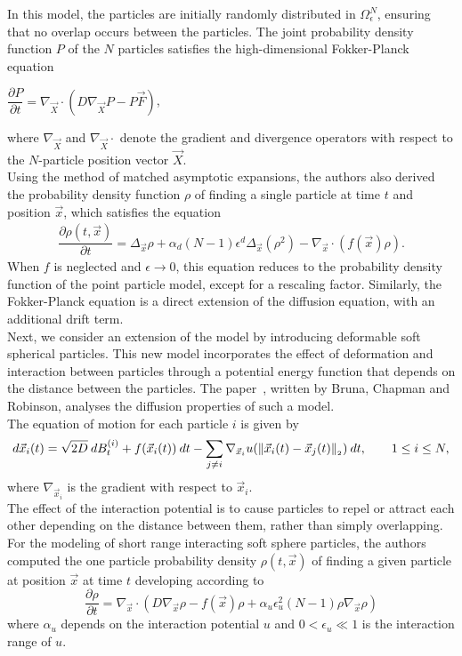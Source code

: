 In this model, the particles are initially randomly distributed in $\Omega^N_{\epsilon}$, ensuring that no overlap occurs between the particles.
The joint probability density function $P$ of the $N$ particles satisfies the high-dimensional Fokker-Planck equation
\begin{center}
	$\dfrac{\partial P}{\partial t} = \nabla_{\vec{X}} \cdot (D \nabla_{\vec{X}} P - P \vec{F})$,
\end{center}
where $\nabla_{\vec{X}}$ and $\nabla_{\vec{X}} \cdot$ denote the gradient and divergence operators with respect to the $N$-particle position vector $\vec{X}$.\\
Using the method of matched asymptotic expansions, the authors also derived the probability density function $\rho$ of finding a single particle at time $t$ and position $\vec{x}$, which satisfies the equation
\begin{align}
	\dfrac{\partial \rho (t, \vec{x})}{\partial t} = \Delta_{\vec{x}} \rho + \alpha_d (N - 1) \epsilon^d \Delta_{\vec{x}} (\rho^2) - \nabla_{\vec{x}} \cdot (f(\vec{x}) \rho).
\end{align}
When $f$ is neglected and $\epsilon \rightarrow 0$, this equation reduces to the probability density function of the point particle model, except for a rescaling factor.
Similarly, the Fokker-Planck equation is a direct extension of the diffusion equation, with an additional drift term.\\

Next, we consider an extension of the model by introducing deformable soft spherical particles. 
This new model incorporates the effect of deformation and interaction between particles through a potential energy function that depends on the distance between the particles.
The paper~\cite{Bruna2017}, written by Bruna, Chapman and Robinson, analyses the diffusion properties of such a model. \\
The equation of motion for each particle $i$ is given by
\begin{equation}
d\vec{x}_i(t) = \sqrt{2D} \: dB_t^{(i)} + f(\vec{x}_i(t))\: dt - \sum\limits_{j\neq i} \nabla_{\vec{x}_i} u (\norm[ \vec{x}_i(t) - \vec{x}_j(t)]) \: dt, \qquad 1 \leq i \leq N,
\end{equation}
where $\nabla_{\vec{x}_i}$ is the gradient with respect to $\vec{x}_i$. \\
The effect of the interaction potential is to cause particles to repel or attract each other depending on the distance between them, rather than simply overlapping. \\
For the modeling of short range interacting soft sphere particles, the authors computed the one particle probability density $\rho(t, \vec{x})$ of finding a given particle at position $\vec{x}$ at time $t$ developing according to
\begin{equation}
\dfrac{\partial \rho}{\partial t} = \nabla_{\vec{x}} \cdot (D \nabla_{\vec{x}} \rho - f(\vec{x}) \rho + \alpha_u \epsilon_u^2(N-1)\rho \nabla_{\vec{x}} \rho)
\end{equation}
where $\alpha_u$ depends on the interaction potential $u$ and $0 < \epsilon_u \ll 1$ is the interaction range of $u$.


